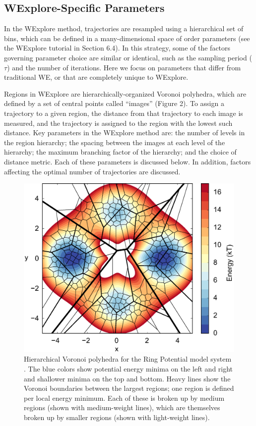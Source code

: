 \documentclass[9pt,tutorial]{livecoms}
\begin{document}
\subsection{WExplore-Specific Parameters}

In the WExplore method, trajectories are resampled using a hierarchical set of bins, which can be defined in a many-dimensional space of order parameters (see the WExplore tutorial in Section 6.4). In this strategy, some of the factors governing parameter choice are similar or identical, such as the sampling period ($\tau$) and the number of iterations. 
Here we focus on parameters that differ from traditional WE, or that are completely unique to WExplore. 

Regions in WExplore are hierarchically-organized Voronoi polyhedra, which are defined by a set of central points called “images” (Figure 2). 
To assign a trajectory to a given region, the distance from that trajectory to each image is measured, and the trajectory is assigned to the region with the lowest such distance. 
Key parameters in the WExplore method are: the number of levels in the region hierarchy; the spacing between the images at each level of the hierarchy; the maximum branching factor of the hierarchy; and the choice of distance metric. 
Each of these parameters is discussed below. 
In addition, factors affecting the optimal number of trajectories are discussed.

\begin{figure}
\includegraphics[width=\linewidth]{Figure2.eps}
\caption{Hierarchical Voronoi polyhedra for the Ring Potential model system \citep{Dickson2009,Adelman2013}.  
The blue colors show potential energy minima on the left and right and shallower minima on the top and bottom. 
Heavy lines show the Voronoi boundaries between the largest regions; one region is defined per local energy minimum.  
Each of these is broken up by medium regions (shown with medium-weight lines), which are themselves broken up by smaller regions (shown with light-weight lines).}
\label{fig:view}
\end{figure}
\end{document}
